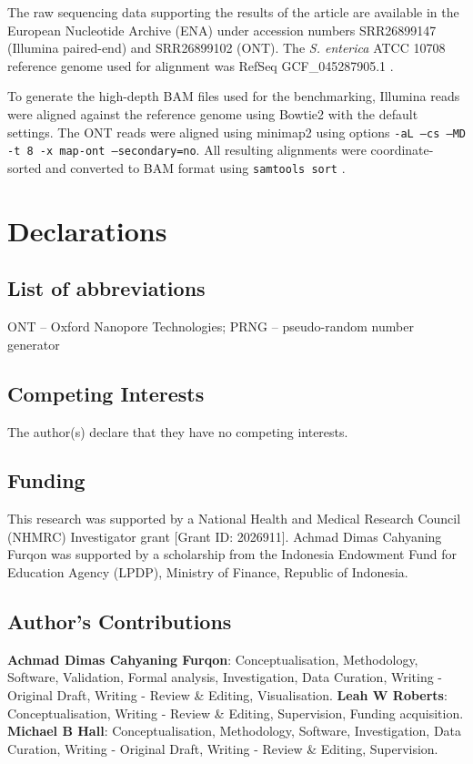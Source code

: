 \documentclass[a4paper,num-refs,gigabyte]{oup-contemporary}
\begin{document}
The raw sequencing data supporting the results of the article are available in the European Nucleotide Archive (ENA) under accession numbers SRR26899147 (Illumina paired-end) and SRR26899102 (ONT). The \textit{S. enterica} ATCC 10708 reference genome used for alignment was RefSeq GCF\_045287905.1 \citep{hall_benchmarking_2024}.

To generate the high-depth BAM files used for the benchmarking, Illumina reads were aligned against the reference genome using Bowtie2 \citep{langmead_scaling_2018} with the default settings. The ONT reads were aligned using minimap2 \citep{li_minimap2_2018} using options \texttt{-aL --cs --MD -t 8 -x map-ont ---secondary=no}. All resulting alignments were coordinate-sorted and converted to BAM format using \texttt{samtools sort} \citep{danecek_twelve_2021}.

\section{Declarations}

\subsection{List of abbreviations}
ONT -- Oxford Nanopore Technologies; PRNG -- pseudo-random number generator

\subsection{Competing Interests}

The author(s) declare that they have no competing interests.

\subsection{Funding}

This research was supported by a National Health and Medical Research Council (NHMRC) Investigator grant [Grant ID: 2026911]. Achmad Dimas Cahyaning Furqon was supported by a scholarship from the Indonesia Endowment Fund for Education Agency (LPDP), Ministry of Finance, Republic of Indonesia.

\subsection{Author's Contributions}

\textbf{Achmad Dimas Cahyaning Furqon}: Conceptualisation, Methodology, Software, Validation, Formal analysis, Investigation, Data Curation, Writing - Original Draft, Writing - Review \& Editing, Visualisation. \textbf{Leah W Roberts}: Conceptualisation, Writing - Review \& Editing, Supervision, Funding acquisition. \textbf{Michael B Hall}: Conceptualisation, Methodology, Software, Investigation, Data Curation, Writing - Original Draft, Writing - Review \& Editing, Supervision.
\end{document}
